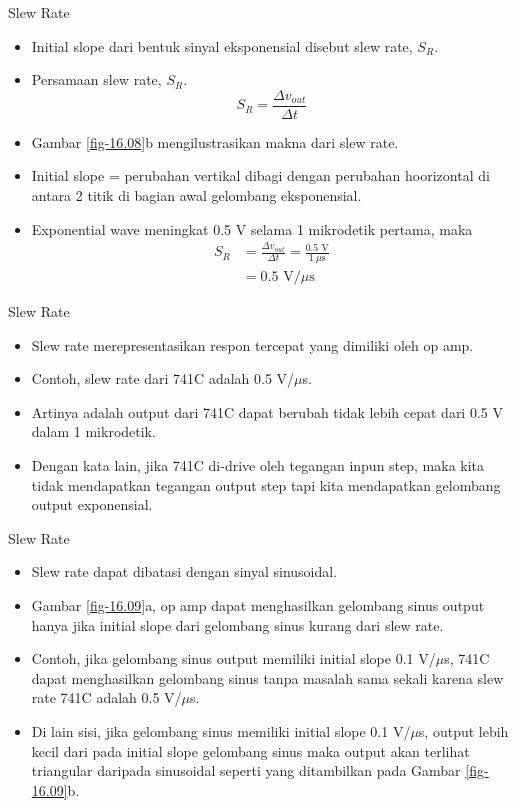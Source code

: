 \begin{frame}{Slew Rate}
	\begin{itemize}
		\item Initial slope dari bentuk sinyal eksponensial disebut slew rate, $ S_R $.
		\item Persamaan slew rate, $ S_R $.
		\begin{equation}\label{pers.16.1}
			S_R = \frac{\Delta v_{out}}{\Delta t}
		\end{equation}
		\item Gambar \ref{fig-16.08}b mengilustrasikan makna dari slew rate.
		\item Initial slope = perubahan vertikal dibagi dengan perubahan hoorizontal di antara 2 titik di bagian awal gelombang eksponensial.
		\item Exponential wave meningkat 0.5 V selama 1 mikrodetik pertama, maka
		\begin{align*}
			S_R &= \frac{\Delta v_{out}}{\Delta t} = \frac{0.5 \text{ V}}{1~\mu\text{s}} \\
			&= 0.5 \text{ V/}\mu\text{s}
		\end{align*}
	\end{itemize}
\end{frame}

\begin{frame}{Slew Rate}
	\begin{itemize}
		\item Slew rate merepresentasikan respon tercepat yang dimiliki oleh op amp.
		\item Contoh, slew rate dari 741C adalah 0.5 V/$\mu$s.
		\item Artinya adalah output dari 741C dapat berubah tidak lebih cepat dari 0.5 V dalam 1 mikrodetik.
		\item Dengan kata lain, jika 741C di-drive oleh tegangan inpun step, maka kita tidak mendapatkan tegangan output step tapi kita mendapatkan gelombang output exponensial.
	\end{itemize}
\end{frame}

\begin{frame}{Slew Rate}
	\begin{itemize}
		\item Slew rate dapat dibatasi dengan sinyal sinusoidal.
		\item Gambar \ref{fig-16.09}a, op amp dapat menghasilkan gelombang sinus output hanya jika initial slope dari gelombang sinus kurang dari slew rate.
		\item Contoh, jika gelombang sinus output memiliki initial slope 0.1 V/$\mu$s, 741C dapat menghasilkan gelombang sinus tanpa masalah sama sekali karena slew rate 741C adalah 0.5 V/$\mu$s.
		\item Di lain sisi, jika gelombang sinus memiliki initial slope 0.1 V/$\mu$s, output lebih kecil dari pada initial slope gelombang sinus maka output akan terlihat triangular daripada sinusoidal seperti yang ditambilkan pada Gambar \ref{fig-16.09}b.
	\end{itemize}
\end{frame}

